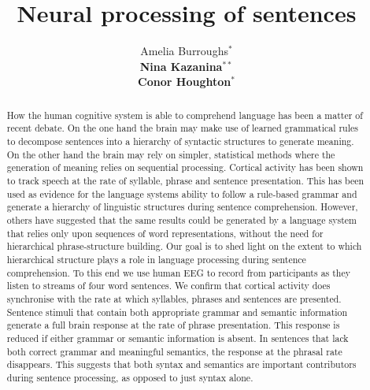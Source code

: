 \documentclass[a4paper,10pt,twoside]{article}
\begin{document}
\title{Neural processing of sentences}

\author{Amelia Burroughs$^*$ \\
{\normalsize \bf Nina Kazanina}$^{**}$ \\
{\normalsize \bf Conor Houghton}$^*$ 
\AND {}
\AND {} }


\maketitle\thispagestyle{empty} %

\begin{abstract}

How the human cognitive system is able to comprehend language has been
a matter of recent debate. 
%
%
On the one hand the brain may make use of
learned grammatical rules to decompose sentences into a hierarchy of
syntactic structures to generate meaning. On the other hand the brain
may rely on simpler, statistical methods where the generation of
meaning relies on sequential processing. 
%
%
Cortical activity has been
shown to track speech at the rate of syllable, phrase and sentence
presentation. This has been used as evidence for the language systems
ability to follow a rule-based grammar and generate a hierarchy of
linguistic structures during sentence comprehension. 
%
%
However, others
have suggested that the same results could be generated by a language
system that relies only upon sequences of word representations,
without the need for hierarchical phrase-structure building. 
%
%
Our goal
is to shed light on the extent to which hierarchical structure plays a
role in language processing during sentence comprehension. To this end
we use human EEG to record from participants as they listen to streams
of four word sentences. 
%
%
We confirm that cortical activity does
synchronise with the rate at which syllables, phrases and sentences
are presented. 
%
%
Sentence stimuli that contain both appropriate grammar
and semantic information generate a full brain response at the rate of
phrase presentation. This response is reduced if either grammar or
semantic information is absent. In sentences that lack both correct
grammar and meaningful semantics, the response at the phrasal rate
disappears. 
%
%
This suggests that both syntax and semantics are important
contributors during sentence processing, as opposed to just syntax
alone. 
%

\end{abstract}
\end{document}
